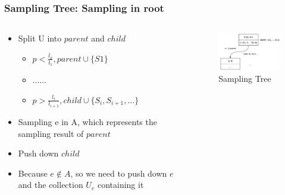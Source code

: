 \documentclass[notheorems, aspectratio=54]{beamer}
\begin{document}
\begin{frame}
    \frametitle{Sampling Tree: Sampling in root}
    \begin{columns}
        \begin{column}{0.48\textwidth}
            \begin{itemize}
                \item Split U into $parent$ and $child$
                \begin{itemize}
                    \item $p < \frac{l_a}{l_1}, parent \cup \{S1\}$
                    \item ......
                    \item $p > \frac{l_i}{l_{i+1}}, child \cup \{S_i, S_{i+1}, ... \}$
                \end{itemize}
                \item Sampling e in A, which represents the sampling result of $parent$
                \item Push down $child$
                \item Because $e \notin A$, so we need to push down $e$ and the collection $U_e$ containing it
            \end{itemize}
        \end{column}
        \begin{column}{0.48\textwidth}
            \begin{figure}
                \centering
                \includegraphics[width=6cm]{global_img_dir/sp1.png}
                \caption{Sampling Tree}
            \end{figure}
        \end{column}
    \end{columns}
\end{frame}
\end{document}
